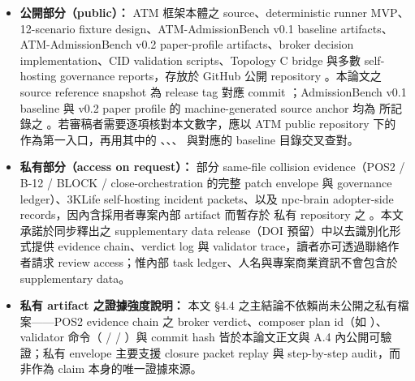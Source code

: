 \documentclass[a4paper,fontset=none]{ctexart}
\begin{document}
\begin{itemize}
\item \textbf{公開部分（public）：} ATM 框架本體之 source、deterministic runner MVP、12-scenario fixture design、ATM-AdmissionBench v0.1 baseline artifacts、ATM-AdmissionBench v0.2 paper-profile artifacts、broker decision implementation、CID validation scripts、Topology C bridge 與多數 self-hosting governance reports，存放於 GitHub 公開 repository \texttt{}。本論文之 source reference snapshot 為 release tag \texttt{} 對應 commit \texttt{}；AdmissionBench v0.1 baseline 與 v0.2 paper profile 的 machine-generated source anchor 均為 \texttt{} 所記錄之 \texttt{}。若審稿者需要逐項核對本文數字，應以 ATM public repository \texttt{} 下的 \texttt{} 作為第一入口，再用其中的 \texttt{}、\texttt{}、\texttt{}、\texttt{} 與對應的 \texttt{} baseline 目錄交叉查對。
\item \textbf{私有部分（access on request）：} 部分 same-file collision evidence（POS2 / B-12 / BLOCK / close-orchestration 的完整 patch envelope 與 governance ledger）、3KLife self-hosting incident packets、以及 npc-brain adopter-side records，因內含採用者專案內部 artifact 而暫存於 \texttt{} 私有 repository 之 \texttt{}。本文承諾於同步釋出之 supplementary data release（DOI 預留）中以去識別化形式提供 evidence chain、verdict log 與 validator trace，讀者亦可透過聯絡作者請求 review access；惟內部 task ledger、人名與專案商業資訊不會包含於 supplementary data。
\item \textbf{私有 artifact 之證據強度說明：} 本文 §4.4 之主結論不依賴尚未公開之私有檔案------POS2 evidence chain 之 broker verdict、composer plan id（如 \texttt{}）、validator 命令（\texttt{} / \texttt{} / \texttt{}）與 commit hash 皆於本論文正文與 A.4 內公開可驗證；私有 envelope 主要支援 closure packet replay 與 step-by-step audit，而非作為 claim 本身的唯一證據來源。
\end{itemize}
\end{document}
